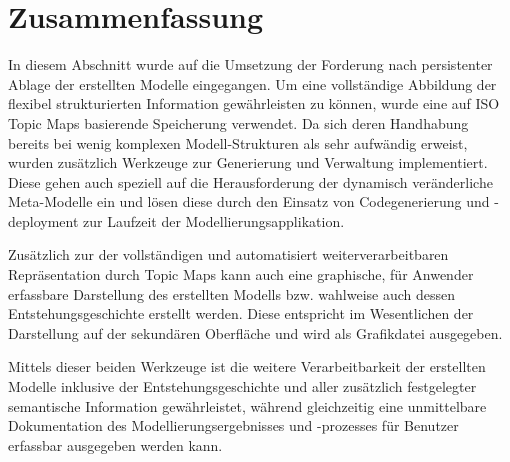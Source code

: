 
\section{Zusammenfassung} %
\label{sec:persistierung_zusammenfassung}

In diesem Abschnitt wurde auf die Umsetzung der Forderung nach persistenter Ablage der erstellten Modelle eingegangen. Um eine vollständige Abbildung der flexibel strukturierten Information gewährleisten zu können, wurde eine auf ISO Topic Maps basierende Speicherung verwendet. Da sich deren Handhabung bereits bei wenig komplexen Modell-Strukturen als sehr aufwändig erweist, wurden zusätzlich Werkzeuge zur Generierung und Verwaltung implementiert. Diese gehen auch speziell auf die Herausforderung der dynamisch veränderliche Meta-Modelle ein und lösen diese durch den Einsatz von Codegenerierung und -deployment zur Laufzeit der Modellierungsapplikation.

Zusätzlich zur der vollständigen und automatisiert weiterverarbeitbaren Repräsentation durch Topic Maps kann auch eine graphische, für Anwender erfassbare Darstellung des erstellten Modells bzw. wahlweise auch dessen Entstehungsgeschichte erstellt werden. Diese entspricht im Wesentlichen der Darstellung auf der sekundären Oberfläche und wird als Grafikdatei ausgegeben. 

Mittels dieser beiden Werkzeuge ist die weitere Verarbeitbarkeit der erstellten Modelle inklusive der Entstehungsgeschichte und aller zusätzlich festgelegter semantische Information gewährleistet, während gleichzeitig eine unmittelbare Dokumentation des Modellierungsergebnisses und -prozesses für Benutzer erfassbar ausgegeben werden kann.

